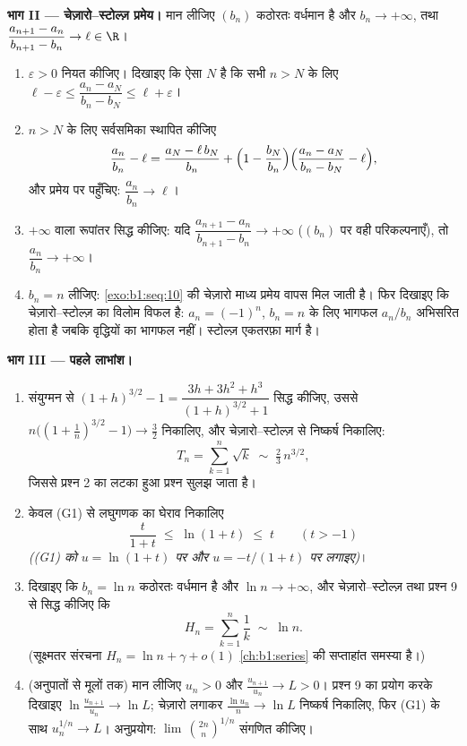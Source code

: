 \begin{problem}[{सप्ताहांत समस्या --- चेज़ारो--स्टोल्ज़ प्रमेय और $u_{n+1} = \sin
u_n$ के लिए अनंतस्पर्शी
$u_n \sim \sqrt{3/n}$}]
\medskip \noindent\textbf{भाग II --- चेज़ारो--स्टोल्ज़ प्रमेय।} मान लीजिए
$(b_n)$ कठोरतः वर्धमान है और $b_n \to +\infty$, तथा $\dfrac{a_{n+1} -
a_n}{b_{n+1} - b_n} \to \ell \in \R$।
\begin{enumerate}[resume]
  \item $\varepsilon > 0$ नियत कीजिए। दिखाइए कि ऐसा $N$ है कि सभी $n > N$ के
  लिए $\ell - \varepsilon \leq \dfrac{a_n - a_N}{b_n - b_N} \leq \ell +
  \varepsilon$।
  \item $n > N$ के लिए सर्वसमिका स्थापित कीजिए
        \[
        \frac{a_n}{b_n} - \ell
        = \frac{a_N - \ell\,b_N}{b_n}
        + \Bigl(1 - \frac{b_N}{b_n}\Bigr)
        \Bigl(\frac{a_n - a_N}{b_n - b_N} - \ell\Bigr),
        \]
        और प्रमेय पर पहुँचिए: $\dfrac{a_n}{b_n} \to \ell$।
  \item $+\infty$ वाला रूपांतर सिद्ध कीजिए: यदि $\dfrac{a_{n+1} -
  a_n}{b_{n+1} - b_n} \to +\infty$ ($(b_n)$ पर वही परिकल्पनाएँ), तो
  $\dfrac{a_n}{b_n} \to +\infty$।
  \item $b_n = n$ लीजिए: \cref{exo:b1:seq:10} की चेज़ारो माध्य प्रमेय वापस
  मिल जाती है। फिर दिखाइए कि चेज़ारो--स्टोल्ज़ का विलोम विफल है: $a_n =
  (-1)^n$, $b_n = n$ के लिए भागफल $a_n/b_n$ अभिसरित होता है जबकि वृद्धियों
  का भागफल नहीं। स्टोल्ज़ एकतरफ़ा मार्ग है।
\end{enumerate}

\medskip \noindent\textbf{भाग III --- पहले लाभांश।}
\begin{enumerate}[resume]
  \item संयुग्मन से $(1+h)^{3/2} - 1 = \dfrac{3h + 3h^2 + h^3}{(1+h)^{3/2} +
  1}$ सिद्ध कीजिए, उससे $n\bigl((1 + \tfrac1n)^{3/2} - 1\bigr) \to \tfrac32$
  निकालिए, और चेज़ारो--स्टोल्ज़ से निष्कर्ष निकालिए:
        \[
        T_n = \sum_{k=1}^{n} \sqrt k \;\sim\; \tfrac23\,
        n^{3/2} ,
        \]
        जिससे प्रश्न 2 का लटका हुआ प्रश्न सुलझ जाता है।
  \item केवल (G1) से लघुगणक का घेराव निकालिए
        \[
        \frac{t}{1 + t} \;\leq\; \ln(1 + t) \;\leq\; t
        \qquad (t > -1)
        \]
        \emph{((G1) को $u = \ln(1+t)$ पर और $u = -t/(1+t)$ पर लगाइए)}।
  \item दिखाइए कि $b_n = \ln n$ कठोरतः वर्धमान है और $\ln n \to +\infty$, और
  चेज़ारो--स्टोल्ज़ तथा प्रश्न 9 से सिद्ध कीजिए कि
        \[
        H_n = \sum_{k=1}^{n} \frac 1k \;\sim\; \ln n .
        \]
        (सूक्ष्मतर संरचना $H_n = \ln n + \gamma + o(1)$ \cref{ch:b1:series}
        की सप्ताहांत समस्या है।)
  \item (अनुपातों से मूलों तक) मान लीजिए $u_n > 0$ और $\frac{u_{n+1}}{u_n}
  \to L > 0$। प्रश्न 9 का प्रयोग करके दिखाइए $\ln\frac{u_{n+1}}{u_n} \to \ln
  L$; चेज़ारो लगाकर $\frac{\ln u_n}{n} \to \ln L$ निष्कर्ष निकालिए, फिर (G1)
  के साथ $u_n^{1/n} \to L$। अनुप्रयोग: $\lim\,\binom{2n}{n}^{1/n}$ संगणित
  कीजिए।
\end{enumerate}


\end{problem}
